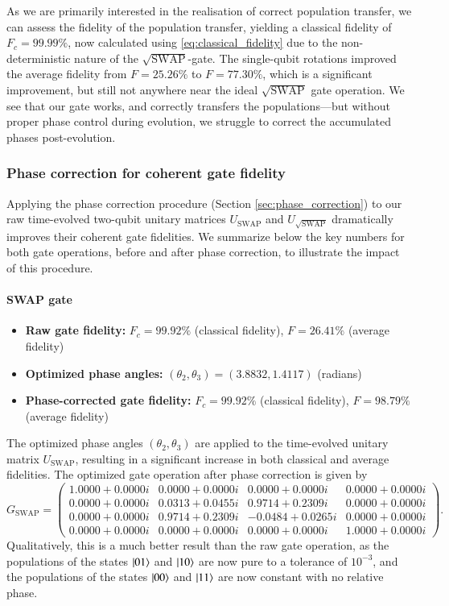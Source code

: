 \documentclass{subfiles}
\begin{document}
As we are primarily interested in the realisation of correct population transfer, we can assess the fidelity of the population transfer, yielding a classical fidelity of $F_c = 99.99\%$, now calculated using \eqref{eq:classical_fidelity} due to the non-deterministic nature of the $\sqrt{\text{SWAP}}$-gate. The single-qubit rotations improved the average fidelity from $F = 25.26\%$ to $F = 77.30\%$, which is a significant improvement, but still not anywhere near the ideal $\sqrt{\text{SWAP}}$ gate operation. We see that our gate works, and correctly transfers the populations—but without proper phase control during evolution, we struggle to correct the accumulated phases post-evolution.

\subsubsection*{Phase correction for coherent gate fidelity}
Applying the phase correction procedure (Section \ref{sec:phase_correction}) to our raw time-evolved two-qubit unitary matrices $U_{\text{SWAP}}$ and $U_{\sqrt{\text{SWAP}}}$ dramatically improves their coherent gate fidelities. We summarize below the key numbers for both gate operations, before and after phase correction, to illustrate the impact of this procedure.
\paragraph{SWAP gate}
\begin{itemize}
    \item \textbf{Raw gate fidelity:} $F_c = 99.92\%$ (classical fidelity), $F = 26.41\%$ (average fidelity)
    \item \textbf{Optimized phase angles:} $(\theta_2, \theta_3) = (3.8832, 1.4117)$ (radians)
    \item \textbf{Phase-corrected gate fidelity:} $F_c = 99.92\%$ (classical fidelity), $F = 98.79\%$ (average fidelity)
\end{itemize}
The optimized phase angles $(\theta_2, \theta_3)$ are applied to the time-evolved unitary matrix $U_{\text{SWAP}}$, resulting in a significant increase in both classical and average fidelities. 
The optimized gate operation after phase correction is given by
\begin{equation}
G_{\mathrm{SWAP}}
=
\begin{pmatrix}
 1.0000 + 0.0000i & 0.0000 + 0.0000i & 0.0000 + 0.0000i & 0.0000 + 0.0000i\\
 0.0000 + 0.0000i & 0.0313 + 0.0455i & 0.9714 + 0.2309i & 0.0000 + 0.0000i\\
 0.0000 + 0.0000i & 0.9714 + 0.2309i & -0.0484 + 0.0265i & 0.0000 + 0.0000i\\
 0.0000 + 0.0000i & 0.0000 + 0.0000i & 0.0000 + 0.0000i & 1.0000 + 0.0000i
\end{pmatrix}.
\end{equation}
Qualitatively, this is a much better result than the raw gate operation, as the populations of the states $\ket{01}$ and $\ket{10}$ are now pure to a tolerance of $10^{-3}$, and the populations of the states $\ket{00}$ and $\ket{11}$ are now constant with no relative phase. 
\end{document}
